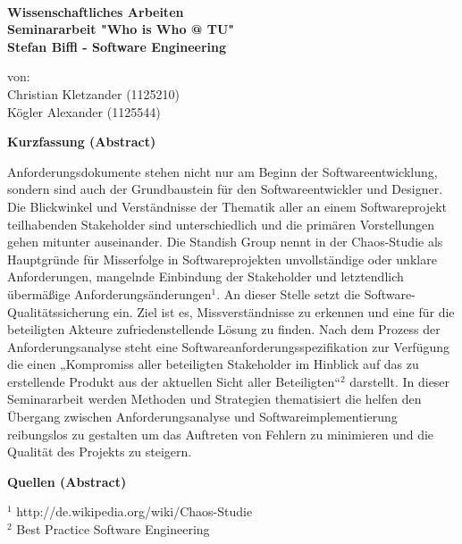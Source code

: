 \documentclass[a4paper]{article}
\begin{document}
\begin{center}
\large
\textbf{
\\
\bigskip
\bigskip
{} Wissenschaftliches Arbeiten\\
\bigskip
Seminararbeit "Who is Who @ TU"\\
Stefan Biffl - Software Engineering
}
\end{center}
\begin{center}
von:\\
Christian Kletzander (1125210) \\
Kögler Alexander (1125544)
\end{center}


\newpage
\tableofcontents
\newpage


\begin{center}

\textbf{Kurzfassung (Abstract)}

\end{center}

Anforderungsdokumente stehen nicht nur am Beginn der Softwareentwicklung, sondern sind auch der Grundbaustein für den Softwareentwickler und Designer. Die Blickwinkel und Verständnisse der Thematik aller an einem Softwareprojekt teilhabenden Stakeholder sind unterschiedlich und die primären Vorstellungen gehen mitunter auseinander. Die Standish Group nennt in der Chaos-Studie als Hauptgründe für Misserfolge in Softwareprojekten unvollständige oder unklare Anforderungen, mangelnde Einbindung der Stakeholder und letztendlich übermäßige Anforderungsänderungen$^{1}$. An dieser Stelle setzt die Software-Qualitätssicherung ein. Ziel ist es, Missverständnisse zu erkennen und eine für die beteiligten Akteure zufriedenstellende Lösung zu finden. Nach dem Prozess der Anforderungsanalyse steht eine Softwareanforderungsspezifikation zur Verfügung die einen „Kompromiss aller beteiligten Stakeholder im Hinblick auf das zu erstellende Produkt aus der aktuellen Sicht aller Beteiligten“$^{2}$ darstellt. In dieser Seminararbeit werden Methoden und Strategien thematisiert die helfen den Übergang zwischen Anforderungsanalyse und Softwareimplementierung reibungslos zu gestalten um das Auftreten von Fehlern zu minimieren und die Qualität des Projekts zu steigern.


\bigskip

\textbf{Quellen (Abstract)}

$^{1}$ http://de.wikipedia.org/wiki/Chaos-Studie \\
$^{2}$ Best Practice Software Engineering
\end{document}
